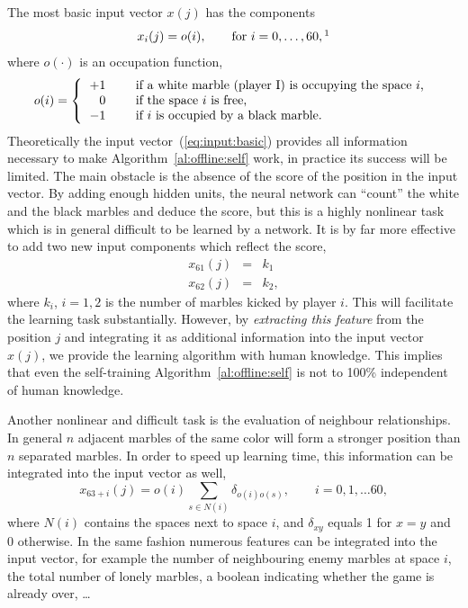 The most basic input vector $x(j)$ has the components 
\begin{equation} \label{eq:input:basic}
x_i(j) = o(i),\qquad \mbox{for } i=0,\ldots,60, \footnotemark
\end{equation}
where $o(\cdot)$ is an occupation function, 
\begin{equation}
o(i) = \left \{
\begin{tabular}{rll}
$+1$ & \qquad & if a white marble (player~I) is occupying the space $i$, \\
0 & & if the space $i$ is free,\\
$-1$ && if $i$ is occupied by a black marble.\\
\end{tabular} 
\right .
\end{equation}
Theoretically the input vector~(\ref{eq:input:basic}) provides all information necessary to make Algorithm~\ref{al:offline:self} work, in practice its success will be limited. The main obstacle is the absence of the score of the position in the input vector. By adding enough hidden units, the neural network can ``count'' the white and the black marbles and deduce the score, but this is a highly nonlinear task which is in general difficult to be learned by a network. It is by far more effective to add two new input components which reflect the score,
\begin{equation} \label{eq:feature:score}
\begin{array}{rcl}
x_{61}(j) & = & k_1 \\
x_{62}(j) & = & k_2,
\end{array}
\end{equation}
where $k_i$, $i=1,2$ is the number of marbles kicked by player $i$. This will facilitate the learning task substantially. However, by \emph{extracting this feature} from the position $j$ and integrating it as additional information into the input vector $x(j)$, we provide the learning algorithm with human knowledge. This implies that even the self-training Algorithm~\ref{al:offline:self} is not to 100\%
independent of human knowledge.

Another nonlinear and difficult task is the evaluation of neighbour relationships. In general $n$ adjacent marbles of the same color will form a stronger position than $n$ separated marbles. In order to speed up learning time, this information can be integrated into the input vector as well,
\begin{equation} \label{eq:feature:neighbour}
x_{63+i}(j) = o(i) \sum_{s \in N(i)} \delta_{o(i)o(s)}, \qquad i = 0,1, \ldots 60,
\end{equation}
where $N(i)$ contains the spaces next to space $i$, and $\delta_{xy}$ equals 1 for $x=y$ and 0 otherwise. In the same fashion numerous features can be integrated into the input vector, for example the number of neighbouring enemy marbles at space $i$, the total number of lonely marbles, a boolean indicating whether the game is already over, \ldots 

